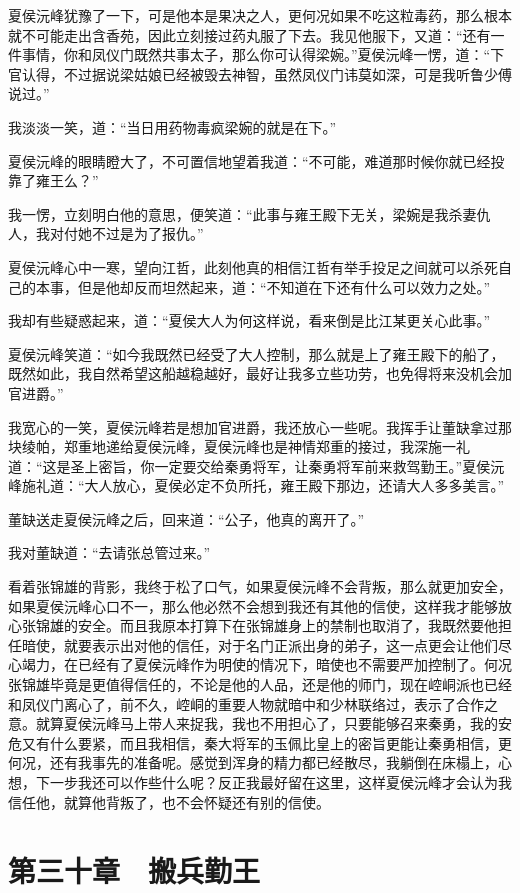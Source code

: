 夏侯沅峰犹豫了一下，可是他本是果决之人，更何况如果不吃这粒毒药，那么根本就不可能走出含香苑，因此立刻接过药丸服了下去。我见他服下，又道：“还有一件事情，你和凤仪门既然共事太子，那么你可认得梁婉。”夏侯沅峰一愣，道：“下官认得，不过据说梁姑娘已经被毁去神智，虽然凤仪门讳莫如深，可是我听鲁少傅说过。”

我淡淡一笑，道：“当日用药物毒疯梁婉的就是在下。”

夏侯沅峰的眼睛瞪大了，不可置信地望着我道：“不可能，难道那时候你就已经投靠了雍王么？”

我一愣，立刻明白他的意思，便笑道：“此事与雍王殿下无关，梁婉是我杀妻仇人，我对付她不过是为了报仇。”

夏侯沅峰心中一寒，望向江哲，此刻他真的相信江哲有举手投足之间就可以杀死自己的本事，但是他却反而坦然起来，道：“不知道在下还有什么可以效力之处。”

我却有些疑惑起来，道：“夏侯大人为何这样说，看来倒是比江某更关心此事。”

夏侯沅峰笑道：“如今我既然已经受了大人控制，那么就是上了雍王殿下的船了，既然如此，我自然希望这船越稳越好，最好让我多立些功劳，也免得将来没机会加官进爵。”

我宽心的一笑，夏侯沅峰若是想加官进爵，我还放心一些呢。我挥手让董缺拿过那块绫帕，郑重地递给夏侯沅峰，夏侯沅峰也是神情郑重的接过，我深施一礼道：“这是圣上密旨，你一定要交给秦勇将军，让秦勇将军前来救驾勤王。”夏侯沅峰施礼道：“大人放心，夏侯必定不负所托，雍王殿下那边，还请大人多多美言。”

董缺送走夏侯沅峰之后，回来道：“公子，他真的离开了。”

我对董缺道：“去请张总管过来。”

看着张锦雄的背影，我终于松了口气，如果夏侯沅峰不会背叛，那么就更加安全，如果夏侯沅峰心口不一，那么他必然不会想到我还有其他的信使，这样我才能够放心张锦雄的安全。而且我原本打算下在张锦雄身上的禁制也取消了，我既然要他担任暗使，就要表示出对他的信任，对于名门正派出身的弟子，这一点更会让他们尽心竭力，在已经有了夏侯沅峰作为明使的情况下，暗使也不需要严加控制了。何况张锦雄毕竟是更值得信任的，不论是他的人品，还是他的师门，现在崆峒派也已经和凤仪门离心了，前不久，崆峒的重要人物就暗中和少林联络过，表示了合作之意。就算夏侯沅峰马上带人来捉我，我也不用担心了，只要能够召来秦勇，我的安危又有什么要紧，而且我相信，秦大将军的玉佩比皇上的密旨更能让秦勇相信，更何况，还有我事先的准备呢。感觉到浑身的精力都已经散尽，我躺倒在床榻上，心想，下一步我还可以作些什么呢？反正我最好留在这里，这样夏侯沅峰才会认为我信任他，就算他背叛了，也不会怀疑还有别的信使。

\chapter{第三十章　搬兵勤王}

